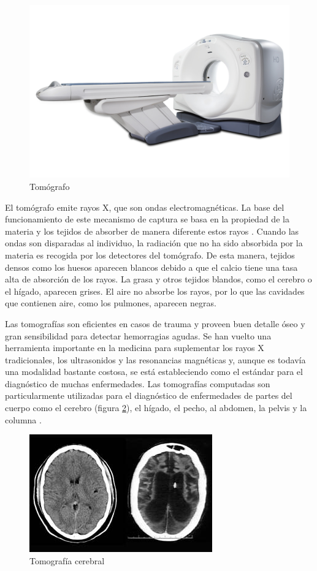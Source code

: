 \begin{figure}[h!]
\centering
\includegraphics[scale=0.3]{images/ge_ct_scanner.jpg}
\caption{Tomógrafo}
\label{fig:tomografo}
\end{figure}

El tomógrafo emite rayos X, que son ondas electromagnéticas. La base del funcionamiento de este mecanismo de captura se basa en la propiedad de la materia y los tejidos de absorber de manera diferente estos rayos \citep{prince2006medical}.
Cuando las ondas son disparadas al individuo, la radiación que no ha sido absorbida por la materia es recogida por los detectores del tomógrafo. De esta manera, tejidos densos como los huesos aparecen blancos debido a que el calcio tiene una tasa alta de absorción de los rayos. La grasa y otros tejidos blandos, como el cerebro o el hígado, aparecen grises. El aire no absorbe los rayos, por lo que las cavidades que contienen aire, como los pulmones, aparecen negras.

Las tomografías son eficientes en casos de trauma y proveen buen detalle óseo y gran sensibilidad para detectar hemorragias agudas. Se han vuelto una herramienta importante en la medicina para suplementar los rayos X tradicionales, los ultrasonidos y las resonancias magnéticas y, aunque es todavía una modalidad bastante costosa, se está estableciendo como el estándar para el diagnóstico de muchas enfermedades. Las tomografías computadas son particularmente utilizadas para el diagnóstico de enfermedades de partes del cuerpo como el cerebro (figura \ref{fig:tomografia_cerebral}), el hígado, el pecho, al abdomen, la pelvis y la columna \citep{sharma2010automated}.

\begin{figure}[h!]
\centering
\includegraphics[scale=1]{images/Schiavo_catscan.jpg}
\caption{Tomografía cerebral}
\label{fig:tomografia_cerebral}
\end{figure}

